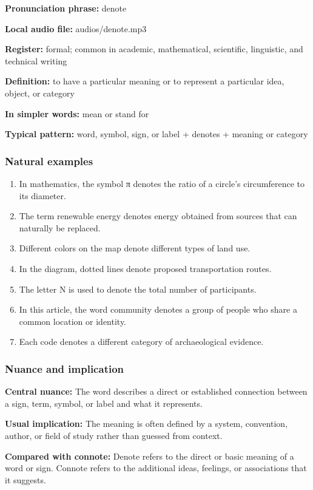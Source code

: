 \documentclass[11pt]{article}
\begin{document}
\textbf{Pronunciation phrase:} denote

\textbf{Local audio file:} audios/denote.mp3

\textbf{Register:} formal; common in academic, mathematical, scientific, linguistic, and technical writing

\textbf{Definition:} to have a particular meaning or to represent a particular idea, object, or category

\textbf{In simpler words:} mean or stand for

\textbf{Typical pattern:} word, symbol, sign, or label + denotes + meaning or category

\subsubsection{Natural examples}
\begin{enumerate}
  \item In mathematics, the symbol π denotes the ratio of a circle's circumference to its diameter.
  \item The term renewable energy denotes energy obtained from sources that can naturally be replaced.
  \item Different colors on the map denote different types of land use.
  \item In the diagram, dotted lines denote proposed transportation routes.
  \item The letter N is used to denote the total number of participants.
  \item In this article, the word community denotes a group of people who share a common location or identity.
  \item Each code denotes a different category of archaeological evidence.
\end{enumerate}

\subsubsection{Nuance and implication}
\textbf{Central nuance:} The word describes a direct or established connection between a sign, term, symbol, or label and what it represents.

\textbf{Usual implication:} The meaning is often defined by a system, convention, author, or field of study rather than guessed from context.

\textbf{Compared with connote:} Denote refers to the direct or basic meaning of a word or sign. Connote refers to the additional ideas, feelings, or associations that it suggests.
\end{document}
